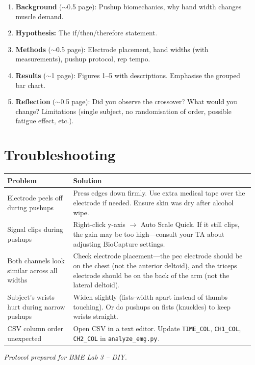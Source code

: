 \documentclass[11pt,letterpaper]{article}
\begin{document}
\begin{enumerate}[nosep]
    \item \textbf{Background} ($\sim$0.5 page): Pushup biomechanics, why hand width changes muscle demand.
    \item \textbf{Hypothesis:} The if/then/therefore statement.
    \item \textbf{Methods} ($\sim$0.5 page): Electrode placement, hand widths (with measurements), pushup protocol, rep tempo.
    \item \textbf{Results} ($\sim$1 page): Figures 1--5 with descriptions.  Emphasise the grouped bar chart.
    \item \textbf{Reflection} ($\sim$0.5 page): Did you observe the crossover?  What would you change?  Limitations (single subject, no randomisation of order, possible fatigue effect, etc.).
\end{enumerate}

\section{Troubleshooting}

\begin{tabularx}{\textwidth}{@{} l X @{}}
\toprule
\textbf{Problem} & \textbf{Solution} \\
\midrule
Electrode peels off during pushups & Press edges down firmly.  Use extra medical tape over the electrode if needed.  Ensure skin was dry after alcohol wipe. \\
\addlinespace
Signal clips during pushups & Right-click y-axis $\rightarrow$ Auto Scale Quick.  If it still clips, the gain may be too high---consult your TA about adjusting BioCapture settings. \\
\addlinespace
Both channels look similar across all widths & Check electrode placement---the pec electrode should be on the chest (not the anterior deltoid), and the triceps electrode should be on the back of the arm (not the lateral deltoid). \\
\addlinespace
Subject's wrists hurt during narrow pushups & Widen slightly (fists-width apart instead of thumbs touching).  Or do pushups on fists (knuckles) to keep wrists straight. \\
\addlinespace
CSV column order unexpected & Open CSV in a text editor.  Update \texttt{TIME\_COL}, \texttt{CH1\_COL}, \texttt{CH2\_COL} in \texttt{analyze\_emg.py}. \\
\bottomrule
\end{tabularx}

\vfill
\begin{center}
\small\textit{Protocol prepared for BME Lab 3 -- DIY.}
\end{center}
\end{document}
